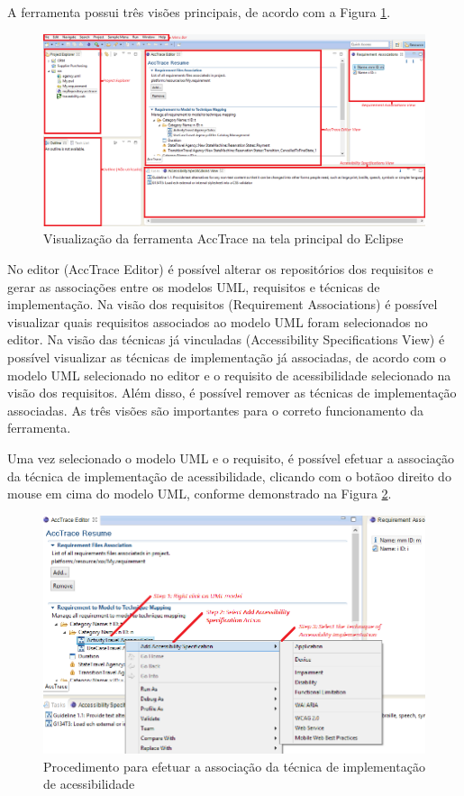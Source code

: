 \documentclass[runningheads,a4paper]{llncs}
\begin{document}
A ferramenta possui três visões principais, de acordo com a Figura \ref{fig:acctrace}. 

\begin{figure}[h!]
\centering
\includegraphics[scale=0.26]{./img/acctrace.png}
\caption{Visualização da ferramenta AccTrace na tela principal do
Eclipse}
\label{fig:acctrace}
\end{figure}

No editor (AccTrace Editor) é possível alterar os repositórios dos requisitos e gerar as associações entre os modelos UML, requisitos e técnicas de implementação. Na visão
dos requisitos (Requirement Associations) é possível visualizar quais requisitos associados
ao modelo UML foram selecionados no editor. Na visão das técnicas já vinculadas
(Accessibility Specifications View) é possível visualizar as técnicas de implementação já
associadas, de acordo com o modelo UML selecionado no editor e o requisito de acessibilidade
selecionado na visão dos requisitos. Além disso, é possível remover as técnicas de
implementação associadas. As três visões são importantes para o correto funcionamento
da ferramenta.

Uma vez selecionado o modelo UML e o requisito, é possível efetuar a associação da
técnica de implementação de acessibilidade, clicando com o botãoo direito do mouse em
cima do modelo UML, conforme demonstrado na Figura \ref{fig:rightclick}.

\begin{figure}[h!]
\centering
\includegraphics[scale=0.25]{./img/rightclick.png}
\caption{Procedimento para efetuar a associação da técnica de implementação de
acessibilidade}
\label{fig:rightclick}
\end{figure}
\end{document}
